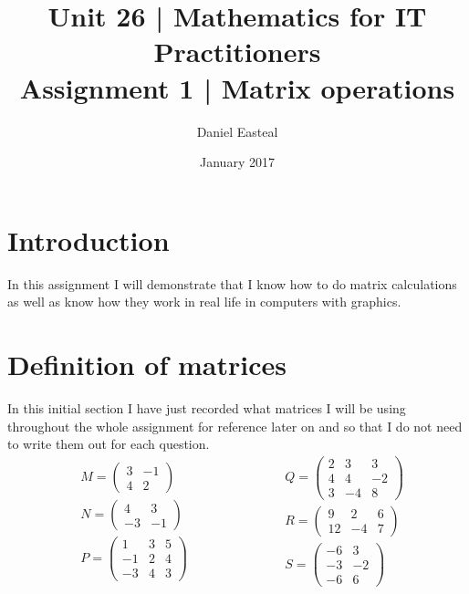 \documentclass{article}
\begin{document}
\title{Unit 26 | Mathematics for IT Practitioners \\ \vspace{1.5cm} Assignment 1 | Matrix operations}
\author{Daniel Easteal}
\date{January 2017}
\maketitle
\newpage
\tableofcontents
\newpage
\section{Introduction}
In this assignment I will demonstrate that I know how to do matrix calculations as well as know how they work in real life in computers with graphics. 
\section{Definition of matrices}
In this initial section I have just recorded what matrices I will be using throughout the whole assignment for reference later on and so that I do not need to write them out for each question.
\begin{equation*}
	\begin{split}
	&M =
	\begin{pmatrix}
		3 & -1\\
		4 & 2
	\end{pmatrix}
	\\
	&N =
	\begin{pmatrix}
		4 & 3\\
		-3 & -1
	\end{pmatrix}
	\\
	&P =
	\begin{pmatrix}
		1 & 3 & 5\\
		-1 & 2 & 4\\
		-3 & 4 & 3
	\end{pmatrix}
\end{split}
\qquad
\qquad
\qquad
\begin{split}
	&Q =
	\begin{pmatrix}
		2 & 3 & 3\\
		4 & 4 & -2\\
		3 & -4 & 8
	\end{pmatrix}
	\\
	&R = 
	\begin{pmatrix}
		9 & 2 & 6\\
		12 & -4 & 7
	\end{pmatrix}
	\\
	&S =
	\begin{pmatrix}
		-6 & 3\\
		-3 & -2\\
		-6 & 6
	\end{pmatrix}
\end{split}
\end{equation*}
\end{document}
